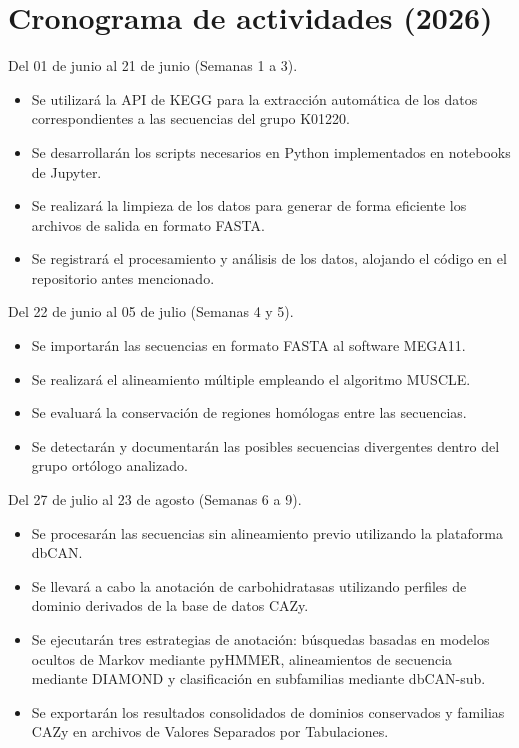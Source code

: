 \section{Cronograma de actividades (2026)}

Del 01 de junio al 21 de junio (Semanas 1 a 3).
\begin{itemize}
	\item Se utilizará la API de KEGG para la extracción automática de los datos correspondientes a las secuencias del grupo K01220.
	\item Se desarrollarán los scripts necesarios en Python implementados en notebooks de Jupyter.
	\item Se realizará la limpieza de los datos para generar de forma eficiente los archivos de salida en formato FASTA.
	\item Se registrará el procesamiento y análisis de los datos, alojando el código en el repositorio antes mencionado.
\end{itemize}

Del 22 de junio al 05 de julio (Semanas 4 y 5).
\begin{itemize}
	\item Se importarán las secuencias en formato FASTA al software MEGA11.
	\item Se realizará el alineamiento múltiple empleando el algoritmo MUSCLE.
	\item Se evaluará la conservación de regiones homólogas entre las secuencias.
	\item Se detectarán y documentarán las posibles secuencias divergentes dentro del grupo ortólogo analizado.
\end{itemize}

Del 27 de julio al 23 de agosto (Semanas 6 a 9).
\begin{itemize}
	\item Se procesarán las secuencias sin alineamiento previo utilizando la plataforma dbCAN.
	\item Se llevará a cabo la anotación de carbohidratasas utilizando perfiles de dominio derivados de la base de datos CAZy.
	\item Se ejecutarán tres estrategias de anotación: búsquedas basadas en modelos ocultos de Markov mediante pyHMMER, alineamientos de secuencia mediante DIAMOND y clasificación en subfamilias mediante dbCAN-sub.
	\item Se exportarán los resultados consolidados de dominios conservados y familias CAZy en archivos de Valores Separados por Tabulaciones.
\end{itemize}

